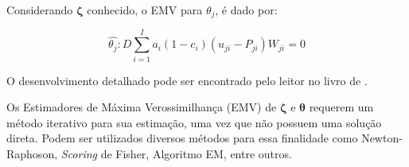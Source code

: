 Considerando $\boldsymbol{\zeta}$ conhecido, o EMV para $ \theta_j $,  é dado por:


\[ \hat{\theta_j} : D\sum_{i=1}^{I}{a_i(1-c_i)(u_{ji}-P_{ji})W_{ji}} = 0  \] 

O desenvolvimento detalhado pode ser encontrado pelo leitor no livro de .

Os Estimadores de Máxima Verossimilhança (EMV) de $ \boldsymbol{\zeta} $ e $ \boldsymbol{\theta} $ requerem um método iterativo para sua estimação, uma vez que não possuem uma solução direta. Podem ser utilizados diversos métodos para essa finalidade como Newton-Raphoson, \textit{Scoring} de Fisher, Algoritmo EM, entre outros.

\begin{comment}
 \citeonline{de2000teoria}. Sendo assim, considerando $\boldsymbol{\hat{\zeta}}^{(t)}_{i}$
uma estimativa de $\boldsymbol{\hat{\zeta}}$ na iteração $t$, o procedimento de
Newton-Raphson é dado por:\\

\noindent $ \boldsymbol{\hat{\zeta}}^{(t+1)}_{i} = \boldsymbol{\hat{\zeta}}^{(t)}_{i} + [\bold{H}(\boldsymbol{\hat{\zeta}}^{(t)})]^{-1}\bold{h}({\boldsymbol{\hat{\zeta}}^{(t)}})
$, onde $\bold{H}$ representa a matriz Hessiana.\\

Na situação que tanto $ \boldsymbol{\hat{\zeta}} $ quanto $ \boldsymbol{\theta} $ são desconhecidos, é a situação mais comum, e requer uma estimação conjunta de ambos.
Para tal finalidade, \citeonline{birnbaum1968}, propôs um algoritmo onde os parâmetros são estimados individualmente, usando um do métodos iterativos citados anteriormente.
O processo é dividido em dois estágios. Inicia-se com um chute inicial, uma estimativa grosseira de $ \boldsymbol{\theta} $ considerando que $ \boldsymbol{\zeta} $ é conhecido, após estimada a habilidade, a segunda parte consiste em estimar $ \boldsymbol{\zeta} $ considerando $ \boldsymbol{\theta} $ (estimado na primeira etapa) como conhecido. Esse processo \textit{vai} e \textit{volta} é repetido até a convergência de ambos os parâmetros.
	
	\subsection{Quadratura}
Os parâmetros dos itens também podem ser estimados em forma de quadratura, onde a distribuição da habilidade latente ($\theta$) é aproximada por um conjunto de pontos de quadratura ($\theta_k$)  e pesos $A_k$, $k = 1, \dots, q$ associados. Esses pontos e pesos,  são usados para calcular a função de verossimilhança em relação à habilidade, permitindo a estimativa dos parâmetros sem a necessidade de integrar analiticamente a distribuição de habilidade contínua.


\end{comment}
